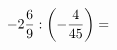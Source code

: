 \documentclass[preview]{standalone}
\begin{document}
\begin{align*}
-2 { 6 \over 9 }  :  \left( - { 4 \over 45 } \right)  =
\end{align*}
\end{document}
